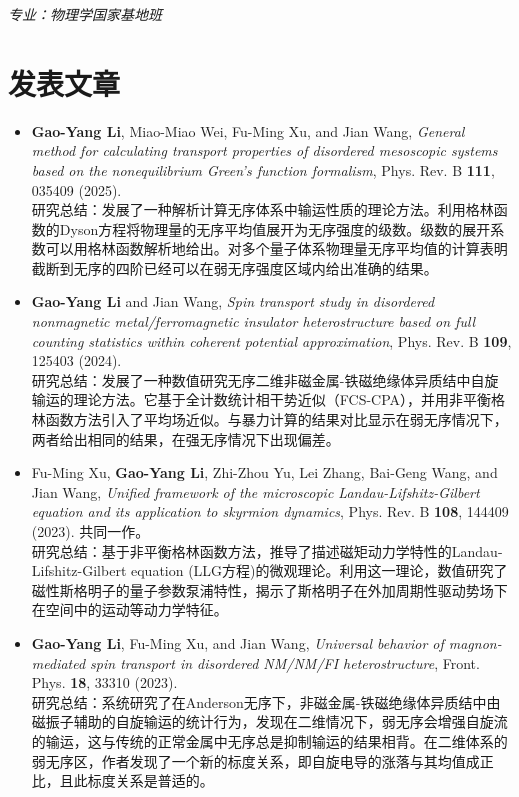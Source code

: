 \documentclass{resume}
\begin{document}
\textit{专业：物理学国家基地班}

\section{发表文章}
\begin{itemize}
\item \textbf{Gao-Yang Li}, Miao-Miao Wei, Fu-Ming Xu, and Jian Wang, \textit{General method for calculating transport properties of disordered mesoscopic systems based on the nonequilibrium Green's function formalism}, Phys. Rev. B \textbf{111}, 035409 (2025).\\
研究总结：发展了一种解析计算无序体系中输运性质的理论方法。利用格林函数的Dyson方程将物理量的无序平均值展开为无序强度的级数。级数的展开系数可以用格林函数解析地给出。对多个量子体系物理量无序平均值的计算表明截断到无序的四阶已经可以在弱无序强度区域内给出准确的结果。%
\item \textbf{Gao-Yang Li} and Jian Wang, \textit{Spin transport study in disordered nonmagnetic metal/ferromagnetic insulator heterostructure based on full counting statistics within coherent potential approximation}, Phys. Rev. B \textbf{109}, 125403 (2024).\\
研究总结：发展了一种数值研究无序二维非磁金属-铁磁绝缘体异质结中自旋输运的理论方法。它基于全计数统计相干势近似（FCS-CPA），并用非平衡格林函数方法引入了平均场近似。与暴力计算的结果对比显示在弱无序情况下，两者给出相同的结果，在强无序情况下出现偏差。
\item Fu-Ming Xu, \textbf{Gao-Yang Li}, Zhi-Zhou Yu, Lei Zhang, Bai-Geng Wang, and Jian Wang, \textit{Unified framework of the microscopic Landau-Lifshitz-Gilbert equation and its application to skyrmion dynamics}, Phys. Rev. B \textbf{108}, 144409 (2023). 共同一作。\\
研究总结：基于非平衡格林函数方法，推导了描述磁矩动力学特性的Landau- Lifshitz-Gilbert equation (LLG方程)的微观理论。利用这一理论，数值研究了磁性斯格明子的量子参数泵浦特性，揭示了斯格明子在外加周期性驱动势场下在空间中的运动等动力学特征。
\item \textbf{Gao-Yang Li}, Fu-Ming Xu, and Jian Wang, \textit{Universal behavior of magnon-mediated spin transport in disordered NM/NM/FI heterostructure}, Front. Phys. \textbf{18}, 33310 (2023).\\
研究总结：系统研究了在Anderson无序下，非磁金属-铁磁绝缘体异质结中由磁振子辅助的自旋输运的统计行为，发现在二维情况下，弱无序会增强自旋流的输运，这与传统的正常金属中无序总是抑制输运的结果相背。在二维体系的弱无序区，作者发现了一个新的标度关系，即自旋电导的涨落与其均值成正比，且此标度关系是普适的。

\end{itemize}
\end{document}
